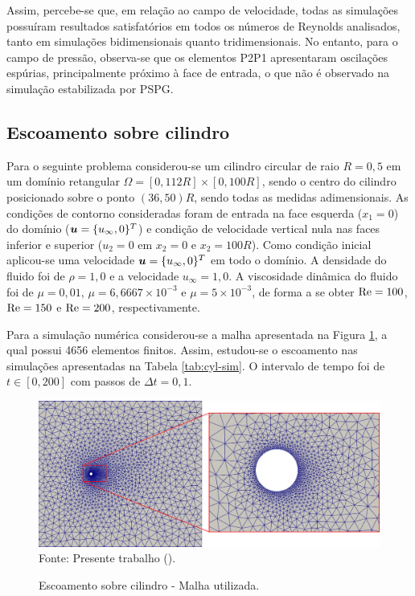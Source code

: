 Assim, percebe-se que, em relação ao campo de velocidade, todas as simulações possuíram resultados satisfatórios em todos os números de Reynolds analisados, tanto em simulações bidimensionais quanto tridimensionais. No entanto, para o campo de pressão, observa-se que os elementos P2P1 apresentaram oscilações espúrias, principalmente próximo à face de entrada, o que não é observado na simulação estabilizada por PSPG.

\subsection{Escoamento sobre cilindro} \label{ex:cylinder}

Para o seguinte problema considerou-se um cilindro circular de raio $R=0,5$ em um domínio retangular $\Omega=[0,112R]\times[0,100R]$, sendo o centro do cilindro posicionado sobre o ponto $(36,50)R$, sendo todas as medidas adimensionais. As condições de contorno consideradas foram de entrada na face esquerda ($x_1=0$) do domínio ($\boldsymbol{u}=\{u_\infty,0\}^T$) e condição de velocidade vertical nula nas faces inferior e superior ($u_2=0$ em $x_2=0$ e $x_2=100R$). Como condição inicial aplicou-se uma velocidade $\boldsymbol{u}=\{u_\infty,0\}^T$ em todo o domínio. A densidade do fluido foi de $\rho=1,0$ e a velocidade $u_\infty=1,0$. A viscosidade dinâmica do fluido foi de $\mu=0,01$, $\mu=6,6667\times10^{-3}$ e $\mu=5\times10^{-3}$, de forma a se obter $\mathrm{Re}=100$, $\mathrm{Re}=150$ e $\mathrm{Re}=200$, respectivamente.

Para a simulação numérica considerou-se a malha apresentada na Figura \ref{fig:cyl-mesh}, a qual possui 4656 elementos finitos. Assim, estudou-se o escoamento nas simulações apresentadas na Tabela \ref{tab:cyl-sim}. O intervalo de tempo foi de $t\in[0,200]$ com passos de $\Delta t=0,1$.

\begin{figure}[h!]
    \centering
    \caption{Escoamento sobre cilindro - Malha utilizada.}
    \includegraphics[width=\linewidth]{Figuras/cylinder/analise2/mesh.png}
    \\Fonte: Presente trabalho (\the\year).
    \label{fig:cyl-mesh}
\end{figure}


